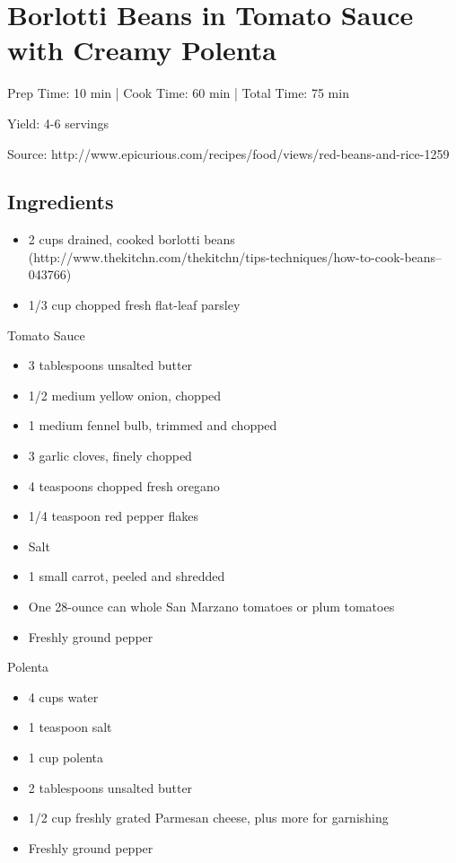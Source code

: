 \section{Borlotti Beans in Tomato Sauce with Creamy Polenta}

\begin{center}
Prep Time: 10 min |
Cook Time: 60 min |
Total Time: 75 min

\noindent Yield: 4-6 servings

\vspace{1em}

Source: http://www.epicurious.com/recipes/food/views/red-beans-and-rice-1259
\end{center}

\subsection{Ingredients}
\begin{itemize}
    \item 2 cups drained, cooked borlotti beans (http://www.thekitchn.com/thekitchn/tips-techniques/how-to-cook-beans--043766)
    \item 1/3 cup chopped fresh flat-leaf parsley
\end{itemize}
Tomato Sauce
\begin{multicols}{2}
\begin{itemize}
    \item 3 tablespoons unsalted butter
    \item 1/2 medium yellow onion, chopped 
    \item 1 medium fennel bulb, trimmed and chopped 
    \item 3 garlic cloves, finely chopped
    \item 4 teaspoons chopped fresh oregano
    \item 1/4 teaspoon red pepper flakes
    \item Salt
    \item 1 small carrot, peeled and shredded
    \item One 28-ounce can whole San Marzano tomatoes or plum tomatoes
    \item Freshly ground pepper
\end{itemize}
\end{multicols}

Polenta
\begin{multicols}{2}
\begin{itemize}
    \item 4 cups water
    \item 1 teaspoon salt
    \item 1 cup polenta
    \item 2 tablespoons unsalted butter
    \item 1/2 cup freshly grated Parmesan cheese, plus more for garnishing
    \item Freshly ground pepper
\end{itemize}
\end{multicols}

